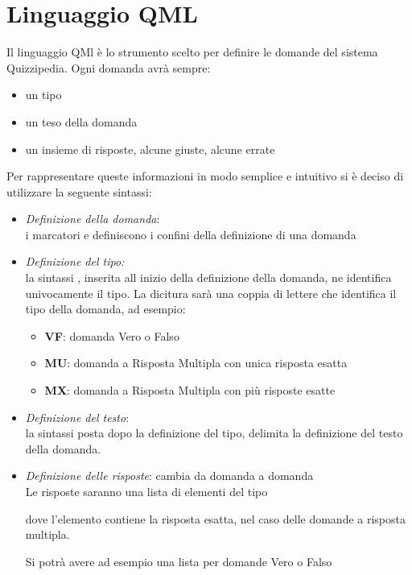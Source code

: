 \section{Linguaggio QML}
Il linguaggio QMl è lo strumento scelto per definire le domande del sistema Quizzipedia.
Ogni domanda avrà sempre:
\begin{itemize}
\item un tipo 
\item un teso della domanda
\item un insieme di risposte, alcune giuste, alcune errate
\end{itemize}
Per rappresentare queste informazioni in modo semplice e intuitivo si è deciso di utilizzare la seguente sintassi:
\begin{itemize}
\item  \textit{Definizione della domanda}: \\
i marcatori  e  definiscono i confini della definizione di una domanda
\item \textit{Definizione del tipo:} \\
la sintassi , inserita all inizio della definizione della domanda, ne identifica univocamente il tipo. La dicitura  sarà una coppia di lettere che identifica il tipo della domanda, ad esempio:
	\begin{itemize}
		\item \textbf{VF}: domanda Vero o Falso
		\item \textbf{MU}: domanda a Risposta Multipla con unica risposta esatta
		\item \textbf{MX}: domanda a Risposta Multipla con più risposte esatte
	\end{itemize}
\item \textit{Definizione del testo}: \\
la sintassi \code{=>} posta dopo la definizione del tipo, delimita la definizione del testo della domanda.
\item\textit{Definizione delle risposte}: cambia da domanda a domanda\\
Le risposte saranno una lista di elementi del tipo 

\newline

dove l'elemento  contiene la risposta esatta, nel caso delle domande a risposta multipla.
\newline

Si potrà avere ad esempio una lista per domande Vero o Falso

\end{itemize} 
\pagebreak

